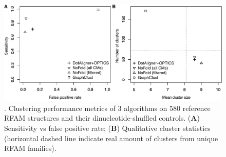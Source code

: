 \documentclass{bmcart}
\begin{document}
\begin{backmatter}
\begin{figure}[h!]
 \includegraphics[width=\textwidth]{Fig4}
 \caption {. Clustering performance metrics of 3 algorithms on 580 reference RFAM 
 structures and their dinucleotide-shuffled controls. (\textbf{A}) Sensitivity vs false positive rate; (\textbf{B}) Qualitative cluster statistics (horizontal dashed line indicate real amount of clusters from unique RFAM families). }
\end{figure}



\end{backmatter}
\end{document}
